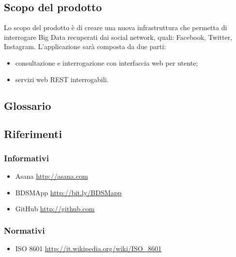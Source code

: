 \subsection{Scopo del prodotto}
Lo scopo del prodotto è di creare una nuova infrastruttura che permetta di interrogare Big Data recuperati dai social network, quali: Facebook, Twitter, Instagram.
L'applicazione sarà composta da due parti:
\begin{itemize}
\item consultazione e interrogazione con interfaccia web per utente;
\item servizi web REST interrogabili.
\end{itemize}

\subsection{Glossario}
\glossarioDesc

\subsection{Riferimenti}

\subsubsection{Informativi}
\begin{itemize}
\item Asana \url{http://asana.com}
\item BDSMApp \url{http://bit.ly/BDSMapp}
\item GitHub \url{http://github.com}
\end{itemize}

\subsubsection{Normativi}
\begin{itemize}
\item ISO 8601 \url{http://it.wikipedia.org/wiki/ISO_8601}
\end{itemize}